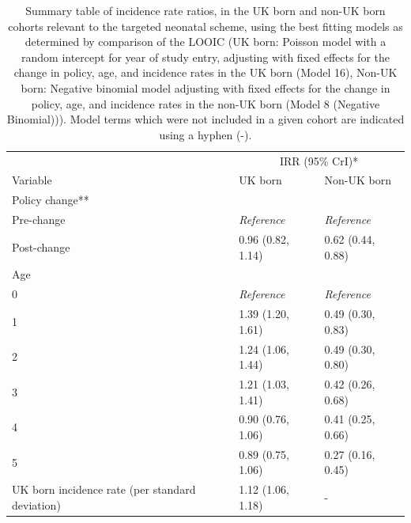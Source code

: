 \documentclass[11pt,twoside]{bristolthesis}
\begin{document}
  \begin{table}[!h]
  
  \caption[Summary table of incidence rate ratios, in the UK born and non-UK born cohorts relevant to the targeted neonatal scheme, using the best fitting models as determined by comparison of the LOOIC.]{\label{tab:07-targeted-tab}Summary table of incidence rate ratios, in the UK born and non-UK born cohorts relevant to the targeted neonatal scheme, using the best fitting models as determined by comparison of the LOOIC (UK born: Poisson model with a random intercept for year of study entry, adjusting with fixed effects for the change in policy, age, and incidence rates in the UK born (Model 16), Non-UK born: Negative binomial model adjusting with fixed effects for the change in policy, age, and incidence rates in the non-UK born (Model 8 (Negative Binomial))). Model terms which were not included in a given cohort are indicated using a hyphen (-).}
  \centering
  \fontsize{8}{10}\selectfont
  \begin{tabular}{lll}
  \toprule
  \multicolumn{1}{c}{ } & \multicolumn{2}{c}{IRR (95\% CrI)*} \\
  \cmidrule(l{3pt}r{3pt}){2-3}
  Variable & UK born & Non-UK born\\
  \midrule
  Policy change** &  & \\
  \hspace{1em}Pre-change & \em{Reference} & \em{Reference}\\
  \hspace{1em}Post-change & 0.96 (0.82, 1.14) & 0.62 (0.44, 0.88)\\
  Age &  & \\
  \hspace{1em}0 & \em{Reference} & \em{Reference}\\
  \addlinespace
  \hspace{1em}1 & 1.39 (1.20, 1.61) & 0.49 (0.30, 0.83)\\
  \hspace{1em}2 & 1.24 (1.06, 1.44) & 0.49 (0.30, 0.80)\\
  \hspace{1em}3 & 1.21 (1.03, 1.41) & 0.42 (0.26, 0.68)\\
  \hspace{1em}4 & 0.90 (0.76, 1.06) & 0.41 (0.25, 0.66)\\
  \hspace{1em}5 & 0.89 (0.75, 1.06) & 0.27 (0.16, 0.45)\\
  \addlinespace
  UK born incidence rate (per standard deviation) & 1.12 (1.06, 1.18) & -\\

\end{tabular}
\end{table}
\end{document}
